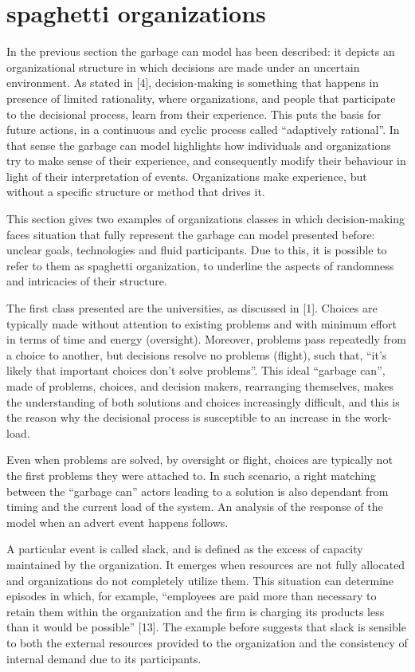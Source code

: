 \section{spaghetti organizations}
In the previous section the garbage can model has been described: it depicts an organizational structure in which decisions are made under an uncertain environment. As stated in [4], decision-making is something that happens in presence of limited rationality, where organizations, and people that participate to the decisional process, learn from their experience. This puts the basis for future actions, in a continuous and cyclic process called “adaptively rational”. In that sense the garbage can model highlights how individuals and organizations try to make sense of their experience, and consequently modify their behaviour in light of their interpretation of events. Organizations make experience, but without a specific structure or method that drives it.

This section gives two examples of organizations classes in which decision-making faces situation that fully represent the garbage can model presented before: unclear goals, technologies and fluid participants. Due to this, it is possible to refer to them as spaghetti organization, to underline the aspects of randomness and intricacies of their structure.

The first class presented are the universities, as discussed in [1]. Choices are typically made without attention to existing problems and with minimum effort in terms of time and energy (oversight). Moreover, problems pass repeatedly from a choice to another, but decisions resolve no problems (flight), such that, “it’s likely that important choices don’t solve problems”. This ideal “garbage can”, made of problems, choices, and decision makers, rearranging themselves, makes the understanding of both solutions and choices increasingly difficult, and this is the reason why the decisional process is susceptible to an increase in the work-load.

Even when problems are solved, by oversight or flight, choices are typically not the first problems they were attached to. In such scenario, a right matching between the “garbage can” actors leading to a solution is also dependant from timing and the current load of the system.
An analysis of the response of the model when an advert event happens follows.

A particular event is called slack, and is defined as the excess of capacity maintained by the organization. It emerges when resources are not fully allocated and organizations do not completely utilize them. This situation can determine episodes in which, for example, “employees are paid more than necessary to retain them within the organization and the firm is charging its products less than it would be possible” [13]. The example before suggests that slack is sensible to both the external resources provided to the organization and the consistency of internal demand due to its participants.

